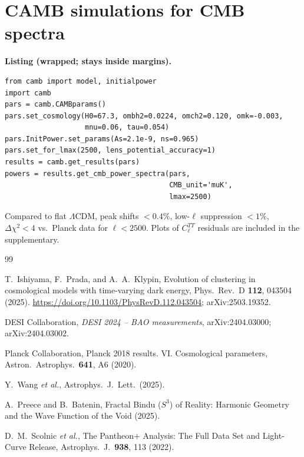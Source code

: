 \documentclass[aps,prd,twocolumn,superscriptaddress,preprintnumbers,amsmath,amssymb,floatfix]{revtex4-2}
\newcommand{\Sthree}{S^{3}}
\begin{document}
\section{CAMB simulations for CMB spectra}\label{app:camb}
\noindent\textbf{Listing (wrapped; stays inside margins).}
\noindent\begin{minipage}{\columnwidth}
\begin{lstlisting}[basicstyle=\ttfamily\scriptsize]
from camb import model, initialpower
import camb
pars = camb.CAMBparams()
pars.set_cosmology(H0=67.3, ombh2=0.0224, omch2=0.120, omk=-0.003,
                   mnu=0.06, tau=0.054)
pars.InitPower.set_params(As=2.1e-9, ns=0.965)
pars.set_for_lmax(2500, lens_potential_accuracy=1)
results = camb.get_results(pars)
powers = results.get_cmb_power_spectra(pars,
                                       CMB_unit='muK',
                                       lmax=2500)
\end{lstlisting}
\end{minipage}

Compared to flat $\Lambda$CDM, peak shifts $<0.4\%$, low-$\ell$ suppression $<1\%$, $\Delta \chi^2 < 4$ vs.\ Planck data for $\ell<2500$. Plots of $C_\ell^{TT}$ residuals are included in the supplementary.

\begin{thebibliography}{99}

T.~Ishiyama, F.~Prada, and A.~A.~Klypin,
Evolution of clustering in cosmological models with time-varying dark energy,
Phys.\ Rev.\ D \textbf{112}, 043504 (2025).
\url{https://doi.org/10.1103/PhysRevD.112.043504}; arXiv:2503.19352.

DESI Collaboration,
\emph{DESI 2024 -- BAO measurements},
arXiv:2404.03000; arXiv:2404.03002.

Planck Collaboration,
Planck 2018 results. VI. Cosmological parameters,
Astron.\ Astrophys.\ \textbf{641}, A6 (2020).

Y.~Wang \emph{et al.}, Astrophys.\ J.\ Lett.\ (2025).

A.~Preece and B.~Batenin,
Fractal Bindu ($\Sthree$) of Reality: Harmonic Geometry and the Wave Function of the Void (2025).

D.~M.~Scolnic \emph{et al.},
The Pantheon+ Analysis: The Full Data Set and Light-Curve Release,
Astrophys.\ J.\ \textbf{938}, 113 (2022).

\end{thebibliography}
\end{document}
